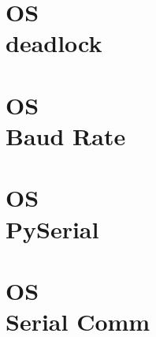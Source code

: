 \documentclass{wileySix}
\begin{document}
\chapter[DeadLock]
{OS\\ deadlock}



\chapter[Baudrate]
{OS\\ Baud Rate}


\chapter[PySerial]
{OS\\ PySerial}


\chapter[Serial Communication di Linux]
{OS\\ Serial Comm}


%

%

%

%

%







\printindex
\end{document}
